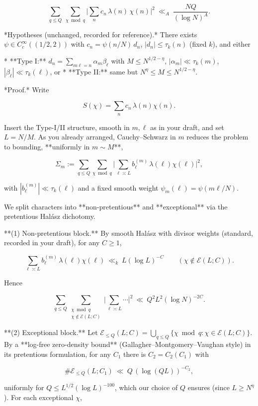 \documentclass[11pt]{article}
\theoremstyle{definition}
\theoremstyle{remark}
\begin{document}
$$
\sum_{q\le Q}\ \sum_{\chi\bmod q}
\Bigg|\sum_{n} c_n\,\lambda(n)\,\chi(n)\Bigg|^2
\ \ll_{A}\ \frac{NQ}{(\log N)^A}.
$$

*Hypotheses (unchanged, recorded for reference).*
There exists $\psi\in C_c^\infty((1/2,2))$ with $c_n=\psi(n/N)\,d_n$, $|d_n|\le \tau_k(n)$ (fixed $k$), and either

* **Type I:** $d_n=\sum_{m\ell=n}\alpha_m\beta_\ell$ with $M\le N^{1/2-\eta}$, $|\alpha_m|\ll \tau_k(m)$, $|\beta_\ell|\ll \tau_k(\ell)$, or
* **Type II:** same but $N^{\eta}\le M\le N^{1/2-\eta}$.

*Proof.* Write

$$
S(\chi)=\sum_{n} c_n\,\lambda(n)\chi(n).
$$

Insert the Type-I/II structure, smooth in $m,\ell$ as in your draft, and set $L=N/M$. As you already arranged, Cauchy–Schwarz in $m$ reduces the problem to bounding, **uniformly in $m\sim M$**,

$$
\Sigma_m:=\sum_{q\le Q}\sum_{\chi\bmod q}\Big|\sum_{\ell\asymp L} b^{(m)}_\ell\,\lambda(\ell)\chi(\ell)\Big|^2,
$$

with $|b^{(m)}_\ell|\ll \tau_k(\ell)$ and a fixed smooth weight $\psi_m(\ell)=\psi(m\ell/N)$.

We split characters into **non-pretentious** and **exceptional** via the pretentious Halász dichotomy.

**(1) Non-pretentious block.**
By smooth Halász with divisor weights (standard, recorded in your draft), for any $C\ge 1$,

$$
\sum_{\ell\asymp L} b^{(m)}_\ell\,\lambda(\ell)\chi(\ell)\ \ll_k\ L(\log L)^{-C}
\qquad(\chi\notin\mathcal E(L;C)).
$$

Hence

$$
\sum_{q\le Q}\sum_{\substack{\chi\bmod q\\ \chi\notin\mathcal E(L;C)}}
\Big|\sum_{\ell\asymp L}\cdots\Big|^2\ \ll\ Q^2 L^2 (\log N)^{-2C}.
$$

**(2) Exceptional block.**
Let $\mathcal E_{\le Q}(L;C)=\bigcup_{q\le Q}\{\chi\bmod q:\chi\in\mathcal E(L;C)\}$. By a **log-free zero-density bound** (Gallagher–Montgomery–Vaughan style) in its pretentious formulation, for any $C_1$ there is $C_2=C_2(C_1)$ with

$$
\#\mathcal E_{\le Q}(L;C_1)\ \ll\ Q\,(\log (QL))^{-C_2},
$$

uniformly for $Q\le L^{1/2}(\log L)^{-100}$, which our choice of $Q$ ensures (since $L\ge N^{\eta}$). For each exceptional $\chi$,
\end{document}
